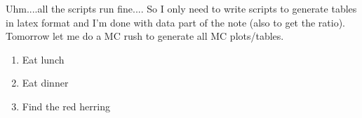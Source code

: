 Uhm....all the scripts run fine....
So I only need to write scripts to generate tables in latex format and I'm done with data part of the note (also to get the ratio).
Tomorrow let me do a MC rush to generate all MC plots/tables.




\begin{enumerate}
\item Eat lunch
\item Eat dinner
\item Find the red herring
\end{enumerate}



